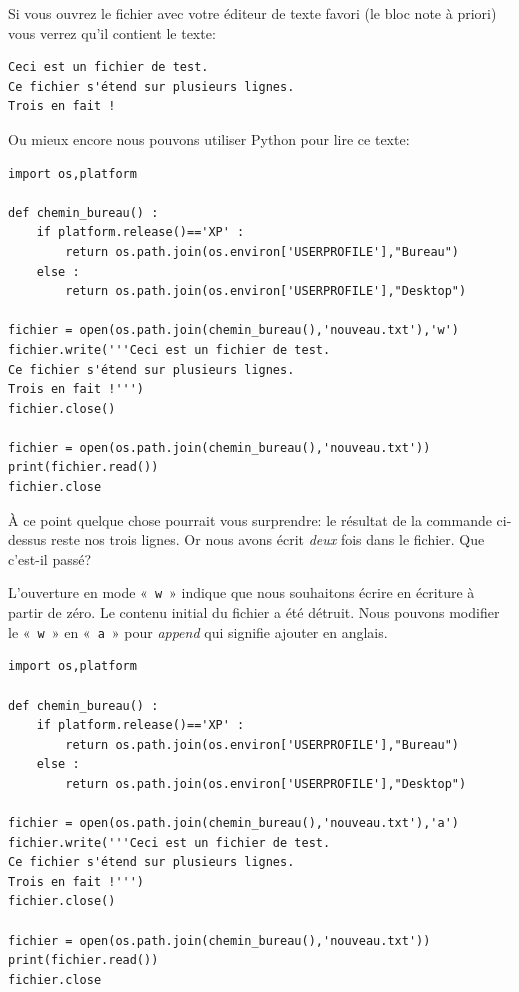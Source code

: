 Si vous ouvrez le fichier avec votre éditeur de texte favori (le bloc note à priori) vous verrez qu'il contient le texte:

\begin{Verbatim}[frame=single,rulecolor=\color{gray}, label=contenu de nouveau.txt]
Ceci est un fichier de test.
Ce fichier s'étend sur plusieurs lignes.
Trois en fait !
\end{Verbatim}

Ou mieux encore nous pouvons utiliser Python pour lire ce texte:

\begin{Verbatim}[frame=single,rulecolor=\color{mbleu}, label=à taper par exemple en reprenant l'existant]
import os,platform

def chemin_bureau() :
    if platform.release()=='XP' :
        return os.path.join(os.environ['USERPROFILE'],"Bureau")
    else :
        return os.path.join(os.environ['USERPROFILE'],"Desktop")
    
fichier = open(os.path.join(chemin_bureau(),'nouveau.txt'),'w')
fichier.write('''Ceci est un fichier de test.
Ce fichier s'étend sur plusieurs lignes.
Trois en fait !''')
fichier.close()

fichier = open(os.path.join(chemin_bureau(),'nouveau.txt'))
print(fichier.read())
fichier.close
\end{Verbatim}

À ce point quelque chose pourrait vous surprendre: le résultat de la commande ci-dessus reste nos trois lignes. Or nous avons écrit \emph{deux} fois dans le fichier. Que c'est-il passé?

L'ouverture en mode «~\texttt{w}~» indique que nous souhaitons écrire en écriture à partir de zéro. Le contenu initial du fichier a été détruit. Nous pouvons modifier le «~\texttt{w}~» en «~\texttt{a}~» pour \emph{append} qui signifie ajouter en anglais.

\begin{Verbatim}[frame=single,rulecolor=\color{mbleu}, label=à taper par exemple en reprenant l'existant]
import os,platform

def chemin_bureau() :
    if platform.release()=='XP' :
        return os.path.join(os.environ['USERPROFILE'],"Bureau")
    else :
        return os.path.join(os.environ['USERPROFILE'],"Desktop")
    
fichier = open(os.path.join(chemin_bureau(),'nouveau.txt'),'a')
fichier.write('''Ceci est un fichier de test.
Ce fichier s'étend sur plusieurs lignes.
Trois en fait !''')
fichier.close()

fichier = open(os.path.join(chemin_bureau(),'nouveau.txt'))
print(fichier.read())
fichier.close
\end{Verbatim}

